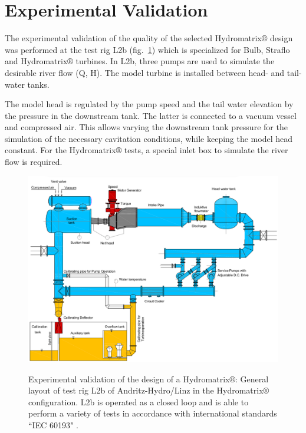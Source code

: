 \FloatBarrier
\section{Experimental Validation}  
The experimental validation of the  quality of the selected Hydromatrix$\circledR$ design was performed at the test rig L2b (fig.\ \ref{exp.lab}) which is specialized for Bulb, Straflo and Hydromatrix$\circledR$ turbines. In L2b, three pumps are used to simulate the desirable river flow (Q, H).  The model turbine is installed between  head- and tail-water tanks.

The model head is regulated by the pump speed and the tail
water elevation by the pressure in the downstream tank. The latter is connected to a vacuum vessel and compressed air. This allows varying the downstream tank pressure for the simulation of the necessary cavitation conditions, while keeping the model head constant. For the Hydromatrix$\circledR$ tests, a special inlet box to simulate the river flow is required.

\begin{figure}[h!]
\centering
\resizebox*{15.0cm}{!}
{\includegraphics[width=1\textwidth]{lab.eps}}
\caption{Experimental validation of the design of a Hydromatrix$\circledR$: General layout of test rig L2b of Andritz-Hydro/Linz in the Hydromatrix$\circledR$ configuration.
L2b is operated as a closed loop and is able to perform a variety of tests in accordance with international standards ``IEC 60193" \cite{IEC}.}
\label{exp.lab}
\end{figure}

